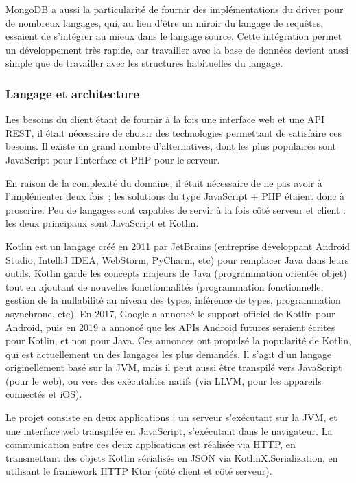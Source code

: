 \uparagraph
MongoDB a aussi la particularité de fournir des implémentations du driver pour de nombreux langages, qui, au lieu d'être un miroir du langage de requêtes, essaient de s'intégrer au mieux dans le langage source.
Cette intégration permet un développement très rapide, car travailler avec la base de données devient aussi simple que de travailler avec les structures habituelles du langage.

\subsubsection{Langage et architecture}

Les besoins du client étant de fournir à la fois une interface web et une API REST, il était nécessaire de choisir des technologies permettant de satisfaire ces besoins.
Il existe un grand nombre d'alternatives, dont les plus populaires sont JavaScript pour l'interface et PHP pour le serveur.

En raison de la complexité du domaine, il était nécessaire de ne pas avoir à l'implémenter deux fois~;
les solutions du type JavaScript + PHP étaient donc à proscrire.
Peu de langages sont capables de servir à la fois côté serveur et client : les deux principaux sont JavaScript et Kotlin.

\uparagraph
Kotlin est un langage créé en 2011 par JetBrains (entreprise développant Android Studio, IntelliJ IDEA, WebStorm, PyCharm, etc) pour remplacer Java dans leurs outils.
Kotlin garde les concepts majeurs de Java (programmation orientée objet) tout en ajoutant de nouvelles fonctionnalités (programmation fonctionnelle, gestion de la nullabilité au niveau des types, inférence de types, programmation asynchrone, etc).
En 2017, Google a annoncé le support officiel de Kotlin pour Android, puis en 2019 a annoncé que les APIs Android futures seraient écrites pour Kotlin, et non pour Java.
Ces annonces ont propulsé la popularité de Kotlin, qui est actuellement un des langages les plus demandés.
Il s'agit d'un langage originellement basé sur la JVM, mais il peut aussi être transpilé vers JavaScript (pour le web), ou vers des exécutables natifs (via LLVM, pour les appareils connectés et iOS).

\uparagraph
Le projet consiste en deux applications : un serveur s'exécutant sur la JVM, et une interface web transpilée en JavaScript, s'exécutant dans le navigateur.
La communication entre ces deux applications est réalisée via HTTP, en transmettant des objets Kotlin sérialisés en JSON via KotlinX.Serialization, en utilisant le framework HTTP Ktor (côté client et côté serveur).

